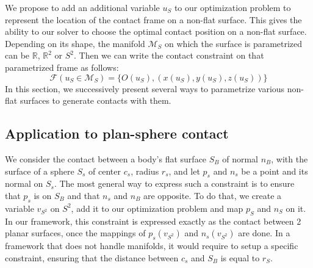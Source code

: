 
We propose to add an additional variable $u_S$ to our optimization problem to represent the location of the contact frame on a non-flat surface.
This gives the ability to our solver to choose the optimal contact position on a non-flat surface.
Depending on its shape, the manifold $\mathcal{M}_S$ on which the surface is parametrized can be $\mathbb{R}$, $\mathbb{R}^2$ or $S^2$.
Then we can write the contact constraint on that parametrized frame as follows:
\begin{equation}
\label{eq:param_frame}
  \mathcal{F}(u_S\in \mathcal{M}_S) = \{O(u_S), (x(u_S), y(u_S), z(u_S))\}
\end{equation}
In this section, we successively present several ways to parametrize various non-flat surfaces to generate contacts with them.



\subsection{Application to plan-sphere contact}
We consider the contact between a body's flat surface $S_B$ of normal $n_B$, with the surface of a sphere $S_s$ of center $c_s$, radius $r_s$, and let $p_s$ and $n_s$ be a point and its normal on $S_s$.
The most general way to express such a constraint is to ensure that $p_s$ is on $S_B$ and that $n_s$ and $n_B$ are opposite.
To do that, we create a variable $v_{S^2}$ on $S^2$, add it to our optimization problem and map $p_S$ and $n_S$ on it.
In our framework, this constraint is expressed exactly as the contact between 2 planar surfaces, once the mappings of $p_s(v_{S^2})$ and $n_s(v_{S^2})$ are done.
In a framework that does not handle manifolds, it would require to setup a specific constraint, ensuring that the distance between $c_s$ and $S_B$ is equal to $r_S$.


